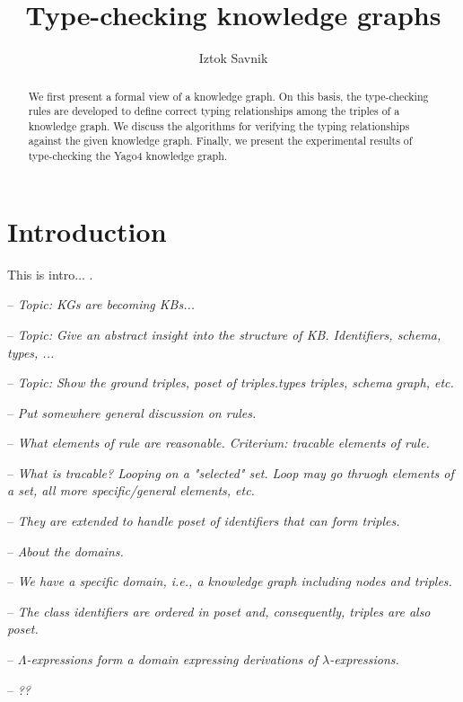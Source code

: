 \documentclass[runningheads]{llncs}
\newcommand{\notes}[1]{\noindent\begin{small}-- \emph{#1}\\\end{small}}
\begin{document}
\title{Type-checking knowledge graphs}

\author{Iztok Savnik} 



\maketitle

\begin{abstract}
  We first present a formal view of a knowledge graph. On this basis,
  the type-checking rules are developed to define correct typing
  relationships among the triples of a knowledge graph. We discuss the
  algorithms for verifying the typing relationships against the given
  knowledge graph. Finally, we present the experimental results of
  type-checking the Yago4 knowledge graph.

\end{abstract}


\thispagestyle{headings}
\tableofcontents
\newpage

\section{Introduction}

This is intro... \cite{Hogan22KGsSurveyCsur}.

\notes{Topic: KGs are becoming KBs...}

\notes{Topic: Give an abstract insight into the structure of KB. Identifiers, schema, types, ...}
\notes{Topic: Show the ground triples, poset of triples.types triples, schema graph, etc.}

\notes{Put somewhere general discussion on rules.}
\notes{What elements of rule are reasonable. Criterium: tracable elements of rule.}
\notes{What is tracable? Looping on a "selected" set. Loop may go thruogh elements of a set, all more specific/general elements, etc.}
\notes{They are extended to handle poset of identifiers that can form triples.}

\notes{About the domains.}
\notes{We have a specific domain, i.e., a knowledge graph including nodes and triples.}
\notes{The class identifiers are ordered in poset and, consequently, triples are also poset.}
\notes{$\Lambda$-expressions form a domain expressing derivations of $\lambda$-expressions.}
\notes{??}
\end{document}
